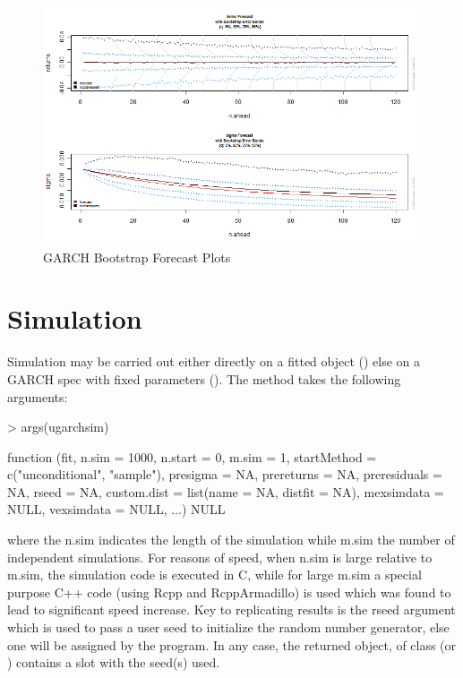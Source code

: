 \begin{figure}
\centering
\includegraphics{boot.png}
\caption[GARCH Bootstrap Forecast Plots]{GARCH Bootstrap Forecast Plots}\label{fig:bootplot}
\end{figure}

\section{Simulation}\label{section:simulation}
Simulation may be carried out either directly on a fitted object (\verb@ugarchsim@)
else on a GARCH spec with fixed parameters (\verb@ugarchpath@). The \verb@ugarchsim@
method takes the following arguments:
\begin{Schunk}
\begin{Sinput}
> args(ugarchsim)
\end{Sinput}
\begin{Soutput}
function (fit, n.sim = 1000, n.start = 0, m.sim = 1, startMethod = c("unconditional",
    "sample"), presigma = NA, prereturns = NA, preresiduals = NA,
    rseed = NA, custom.dist = list(name = NA, distfit = NA),
    mexsimdata = NULL, vexsimdata = NULL, ...)
NULL
\end{Soutput}
\end{Schunk}
where the n.sim indicates the length of the simulation while m.sim the number of
independent simulations. For reasons of speed, when n.sim is large relative to
m.sim, the simulation code is executed in C, while for large m.sim a special
purpose C++ code (using Rcpp and RcppArmadillo) is used which was found to lead
to significant speed increase. Key to replicating results is the rseed argument
which is used to pass a user seed to initialize the random number generator, else
one will be assigned by the program. In any case, the returned object, of class
\verb@uGARCHsim@ (or \verb@uGARCHpath@) contains a slot with the seed(s) used.
